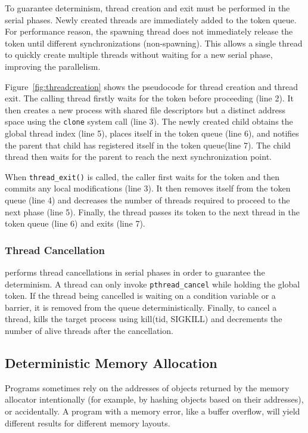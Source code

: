 To guarantee determinism, thread creation and exit must be performed in the serial phases.  Newly created threads are immediately added to the token queue.  For performance reason, the spawning thread does not immediately release the token until different synchronizations (non-spawning). This allows a single thread to quickly create multiple threads without waiting for a new serial phase, improving the parallelism.

Figure~\ref{fig:threadcreation} shows the pseudocode for thread creation and thread exit. The calling thread firstly waits for the token before proceeding (line 2).  It then creates a new process with shared file descriptors but a distinct address space using the \texttt{clone} system call (line 3).  The newly created child obtains the global thread index (line 5), places itself in the token queue (line 6), and notifies the parent that child has registered itself in the token queue(line 7). The child thread then waits for the parent to reach the next synchronization point. 

When \texttt{thread\_exit()} is called, the caller first waits for the token and then commits any local modifications (line 3). It then removes itself from the token queue (line 4) and decreases the number of threads required to proceed to the next phase (line 5). Finally, the thread passes its token to the next thread in the token queue (line 6) and exits (line 7).

\subsubsection{Thread Cancellation}

\dthreads{} performs thread cancellations in serial phases in order to guarantee the determinism. A thread can only invoke \texttt{pthread\_cancel} while holding the global token. If the thread being cancelled is waiting on a condition variable or a barrier, it is removed from the queue deterministically. Finally, to cancel a thread, \dthreads{} kills the target process using kill(tid, SIGKILL) and decrements the number of alive threads after the cancellation.

\subsection{Deterministic Memory Allocation}
Programs sometimes rely on the addresses of objects returned by the memory allocator intentionally (for example, by hashing objects based on their addresses), or accidentally. A program with a memory error, like a buffer overflow, will yield different results for different memory layouts.

